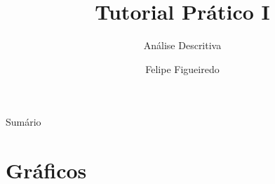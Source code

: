 \documentclass{beamer}
\title%
{Tutorial Prático I}
\subtitle
{Análise Descritiva} %
\author%
{Felipe Figueiredo}%
\institute[] %
{Instituto Nacional de Traumatologia e Ortopedia
}
\date%
{}
\begin{document}
\begin{frame}
  \titlepage
\end{frame}

\begin{frame}{Sumário}
  \tableofcontents
\end{frame}








\section{Gráficos}
\end{document}
